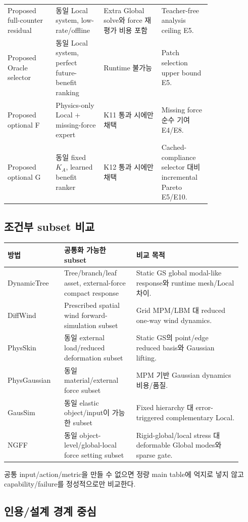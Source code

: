 \documentclass[10pt,a4paper]{article}
\begin{document}
\begin{longtable}{L{0.20\linewidth}L{0.18\linewidth}L{0.24\linewidth}L{0.18\linewidth}}
Proposed full-counter residual & 동일 Local system, low-rate/offline & Extra Global solve와 force 재평가 비용 포함 & Teacher-free analysis ceiling E5. \\
Proposed Oracle selector & 동일 Local system, perfect future-benefit ranking & Runtime 불가능 & Patch selection upper bound E5. \\
Proposed optional F & Physics-only Local + missing-force expert & K11 통과 시에만 채택 & Missing force 순수 기여 E4/E8. \\
Proposed optional G & 동일 fixed \(K_A\), learned benefit ranker & K12 통과 시에만 채택 & Cached-compliance selector 대비 incremental Pareto E5/E10. \\
\bottomrule
\end{longtable}
\normalsize

\subsection{조건부 subset 비교}

\begin{longtable}{L{0.22\linewidth}L{0.29\linewidth}L{0.41\linewidth}}
\toprule
방법 & 공통화 가능한 subset & 비교 목적 \\
\midrule
DynamicTree & Tree/branch/leaf asset, external-force compact response & Static GS global modal-like response와 runtime mesh/Local 차이. \\
DiffWind & Prescribed spatial wind forward-simulation subset & Grid MPM/LBM 대 reduced one-way wind dynamics. \\
PhysSkin & 동일 external load/reduced deformation subset & Static GS의 point/edge reduced basis와 Gaussian lifting. \\
PhysGaussian & 동일 material/external force subset & MPM 기반 Gaussian dynamics 비용/품질. \\
GausSim & 동일 elastic object/input이 가능한 subset & Fixed hierarchy 대 error-triggered complementary Local. \\
NGFF & 동일 object-level/global-local force setting subset & Rigid-global/local stress 대 deformable Global modes와 sparse gate. \\
\bottomrule
\end{longtable}

공통 input/action/metric을 만들 수 없으면 정량 main table에 억지로 넣지 않고 capability/failure를 정성적으로만 비교한다.

\subsection{인용/설계 경계 중심}
\end{document}
